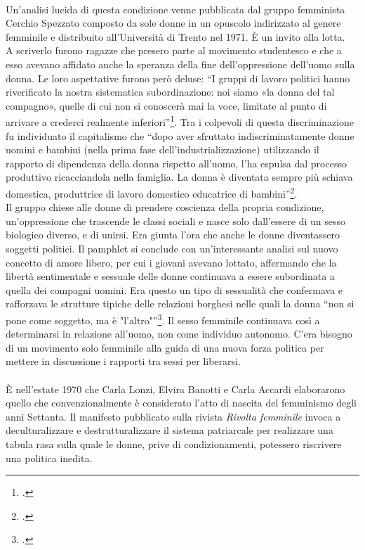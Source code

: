 \paragraph{}Un'analisi lucida di questa condizione venne pubblicata dal gruppo femminista Cerchio Spezzato composto da sole donne in un opuscolo indirizzato al genere femminile e distribuito all'Università di Trento nel 1971.
È un invito alla lotta.
\\A scriverlo furono ragazze che presero parte al movimento studentesco e che a esso avevano affidato anche la speranza della fine dell'oppressione dell'uomo sulla donna.
Le loro aspettative furono però deluse: \enquote{I gruppi di lavoro politici hanno riverificato la nostra sistematica subordinazione: noi siamo «la donna del tal compagno», quelle di cui non si conoscerà mai la voce, limitate al punto di arrivare a crederci realmente inferiori}\footcite{CerchioSpezzato}.
Tra i colpevoli di questa discriminazione fu individuato il capitalismo che \enquote{dopo aver sfruttato indiscriminatamente donne uomini e bambini (nella prima fase dell'industrializzazione) utilizzando il rapporto di dipendenza della donna rispetto all'uomo, l'ha espulsa dal processo produttivo ricacciandola nella famiglia. La donna è diventata sempre più schiava domestica, produttrice di lavoro domestico educatrice di bambini}\footcite{CerchioSpezzato}.
\\Il gruppo chiese alle donne di prendere coscienza della propria condizione, un'oppressione che trascende le classi sociali e nasce solo dall'essere di un sesso biologico diverso, e di unirsi.
Era giunta l'ora che anche le donne diventassero soggetti politici.
Il pamphlet si conclude con un'interessante analisi sul nuovo concetto di amore libero, per cui i giovani avevano lottato, affermando che la libertà sentimentale e sessuale delle donne continuava a essere subordinata a quella dei compagni uomini. Era questo un tipo di sessualità che confermava e rafforzava le strutture tipiche delle relazioni borghesi nelle quali la donna \enquote{non si pone come soggetto, ma è "l'altro"}\footcite{CerchioSpezzato}.
Il sesso femminile continuava così a determinarsi in relazione all'uomo, non come individuo autonomo.
C'era bisogno di un movimento solo femminile alla guida di una nuova forza politica per mettere in discussione i rapporti tra sessi per liberarsi.

\paragraph{}È nell'estate 1970 che Carla Lonzi, Elvira Banotti e Carla Accardi elaborarono quello che convenzionalmente è considerato l'atto di nascita del femminismo degli anni Settanta.
Il manifesto pubblicato sulla rivista \textit{Rivolta femminile} invoca a deculturalizzare e destrutturalizzare il sistema patriarcale per realizzare una tabula rasa sulla quale le donne, prive di condizionamenti, potessero riscrivere una politica inedita.

